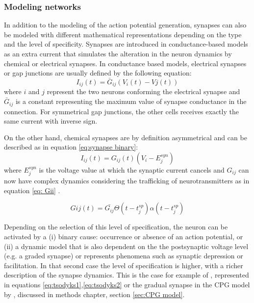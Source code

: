 \subsubsection{\large{Modeling networks}}
\label{c-intro-synapses}
In addition to the modeling of the action potential generation, synapses can also be modeled with different mathematical representations depending on the type and the level of specificity. Synapses are introduced in conductance-based models as an extra current that simulates the alteration in the neuron dynamics by chemical or electrical synapses. In conductance based models, electrical synapses or gap junctions are usually defined by the following equation:
\begin{equation}
    I_{ij}(t) = \bar{G}_{ij} (V_i(t) - Vj(t))
\end{equation}
\noindent where $i$ and $j$ represent the two neurons conforming the electrical synapse and $\bar{G}_{ij}$ is a constant representing the maximum value of synapse conductance in the connection. For symmetrical gap junctions, the other cells receives exactly the same current with inverse sign.

On the other hand, chemical synapses are by definition asymmetrical and can be described as in equation \ref{eq:synapse binary}:
\begin{equation}
     I_{ij}(t) = G_{ij}(t) (V_i - E_j^{syn})
     \label{eq:synapse binary}
\end{equation}
\noindent where $E_j^{syn}$ is the voltage value at which the synaptic current cancels and $G_{ij}$ can now have complex dynamics considering the trafficking of neurotransmitters as in equation \ref{eq: Gii} \parencite{torres_modeling_2012}. 

\begin{equation}
	G{ij}(t) = \bar{G_{ij}}  \Theta(t-t_j^{sp}) \alpha (t-t_j^{sp})
	\label{eq: Gii}
\end{equation}

Depending on the selection of this level of specification, the neuron can be activated by a (i) binary cause: occurrence or absence of an action potential, or (ii) a dynamic model that is also dependent on the the postsynaptic voltage level (e.g. a graded synapse) or represents phenomena such as synaptic depression or facilitation. In that second case the level of specification is higher, with a richer description of the synapse dynamics. This is the case for example of \cite{tsodyks_neural_1997}, represented in equations \ref{eq:tsodyks1},\ref{eq:tsodyks2} or the gradual synapse in the CPG model by \cite{vavoulis_dynamic_2007}, discussed in methods chapter, section \ref{sec:CPG model}.


